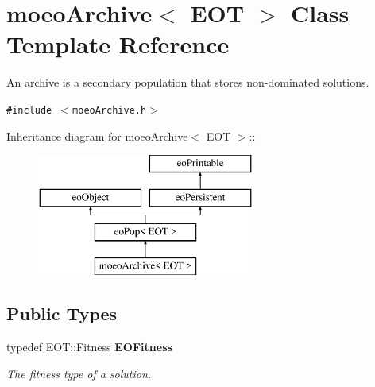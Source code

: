 \section{moeo\-Archive$<$ EOT $>$ Class Template Reference}
\label{classmoeoArchive}
An archive is a secondary population that stores non-dominated solutions.  


{\tt \#include $<$moeo\-Archive.h$>$}

Inheritance diagram for moeo\-Archive$<$ EOT $>$::\begin{figure}[H]
\begin{center}
\leavevmode
\includegraphics[height=4cm]{classmoeoArchive}
\end{center}
\end{figure}
\subsection*{Public Types}
\begin{CompactItemize}
\item 
typedef EOT::Fitness {\bf EOFitness}\label{classmoeoArchive_798bc97d8321b1e2c469e5c341a96dac}

\begin{CompactList}\small\item\em The fitness type of a solution. \item\end{CompactList}\end{CompactItemize}
